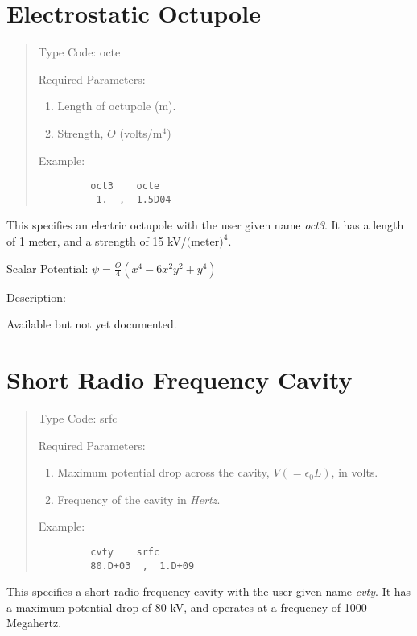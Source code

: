 \newpage
\section{Electrostatic Octupole}
\begin{quotation}
\noindent Type Code:  octe
\vspace{5mm}

\noindent Required Parameters:
\begin{enumerate}
      \item  Length of octupole (m).
      \item  Strength, $O$ (volts/$\mbox{m}^4$)
\end{enumerate}

\vspace{5mm}
\noindent Example:
\begin{verbatim}
         oct3    octe
          1.  ,  1.5D04
\end{verbatim}
\end{quotation}
This specifies an electric octupole with the user given name {\em oct3}.  It has
a length of 1 meter, and a strength of 15 kV/$\mbox{(meter)}^4$.

\vspace{5mm}
     Scalar Potential:  $\displaystyle \psi = \frac{O}{4}(x^4 - 6x^2 y^2 + y^4)$

\vspace{5mm}
      Description:
\vspace{2mm}

      Available but not yet documented.


\newpage
\section{Short Radio Frequency Cavity}
\begin{quotation}
\noindent Type Code:  srfc
\vspace{5mm}

\noindent Required Parameters:
\begin{enumerate}
      \item  Maximum potential drop across the cavity, $V (= \epsilon_0 L)$, in volts.
      \item  Frequency of the cavity in {\em Hertz}.
\end{enumerate}

\vspace{5mm}
\noindent     Example:
\begin{verbatim}
         cvty    srfc
         80.D+03  ,  1.D+09
\end{verbatim}
\end{quotation}
This specifies a short radio frequency cavity with the user given name
{\em cvty}. It has a maximum potential drop of 80 kV, and operates at a frequency
of 1000 Megahertz.

